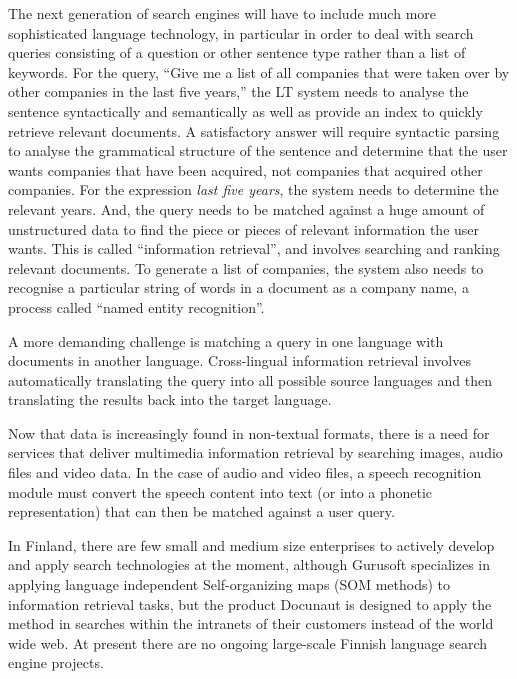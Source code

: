 \documentclass[]{../../metanetpaper}
\begin{document}
\begin{Parallel}[c]{70mm}{70mm}
{%

The next generation of search engines will have to include much more
sophisticated language technology, in particular in order to deal with
search queries consisting of a question or other sentence type rather
than a list of keywords. For the query, “Give me a list of all
companies that were taken over by other companies in the last five
years,” the LT system needs to analyse the sentence syntactically and
semantically as well as provide an index to quickly retrieve relevant
documents. A satisfactory answer will require syntactic parsing to
analyse the grammatical structure of the sentence and determine that
the user wants companies that have been acquired, not companies that
acquired other companies. For the expression \textit{last five years},
the system needs to determine the relevant years. And, the query needs
to be matched against a huge amount of unstructured data to find the
piece or pieces of relevant information the user wants. This is called
“information retrieval”, and involves searching and ranking relevant
documents. To generate a list of companies, the system also needs to
recognise a particular string of words in a document as a company
name, a process called “named entity recognition”.

A more demanding challenge is matching a query in one language with
documents in another language. Cross-lingual information retrieval
involves automatically translating the query into all possible source
languages and then translating the results back into the target
language.

Now that data is increasingly found in non-textual formats, there is a
need for services that deliver multimedia information retrieval by
searching images, audio files and video data. In the case of audio and
video files, a speech recognition module must convert the speech
content into text (or into a phonetic representation) that can then be
matched against a user query.

In Finland, there are few small and medium size enterprises to actively develop and apply search
technologies at the moment, although Gurusoft specializes in applying
language independent Self-organizing maps (SOM methods) to information
retrieval tasks, but the product Docunaut is designed to apply the method in searches within the intranets of their customers instead of the world wide web. At present
there are no ongoing large-scale Finnish language search engine
projects.



}
\end{Parallel}
\end{document}
